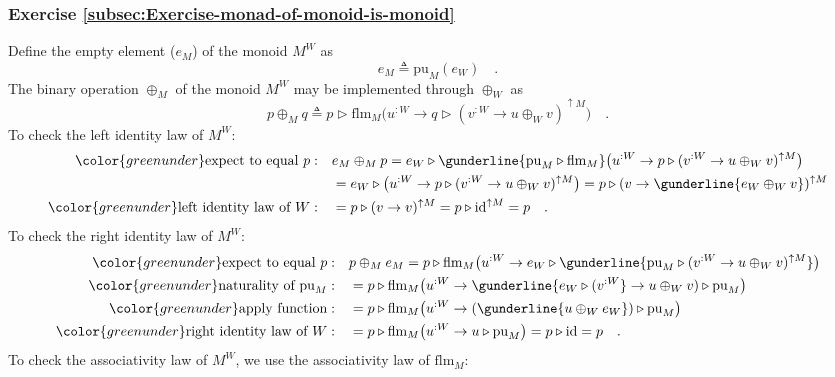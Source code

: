\subsubsection*{Exercise \ref{subsec:Exercise-monad-of-monoid-is-monoid}}

Define the empty element ($e_{M}$) of the monoid $M^{W}$ as 
\[
e_{M}\triangleq\text{pu}_{M}(e_{W})\quad.
\]
The binary operation $\oplus_{M}$ of the monoid $M^{W}$ may be implemented
through $\oplus_{W}$ as
\[
p\oplus_{M}q\triangleq p\triangleright\text{flm}_{M}\big(u^{:W}\rightarrow q\triangleright(v^{:W}\rightarrow u\oplus_{W}v)^{\uparrow M}\big)\quad.
\]
To check the left identity law of $M^{W}$:
\begin{align*}
{\color{greenunder}\text{expect to equal }p:}\quad & e_{M}\oplus_{M}p=e_{W}\triangleright\gunderline{\text{pu}_{M}\triangleright\text{flm}_{M}}\big(u^{:W}\rightarrow p\triangleright(v^{:W}\rightarrow u\oplus_{W}v)^{\uparrow M}\big)\\
 & =e_{W}\triangleright\big(u^{:W}\rightarrow p\triangleright(v^{:W}\rightarrow u\oplus_{W}v)^{\uparrow M}\big)=p\triangleright(v\rightarrow\gunderline{e_{W}\oplus_{W}v})^{\uparrow M}\\
{\color{greenunder}\text{left identity law of }W:}\quad & =p\triangleright(v\rightarrow v)^{\uparrow M}=p\triangleright\text{id}^{\uparrow M}=p\quad.
\end{align*}
To check the right identity law of $M^{W}$:
\begin{align*}
{\color{greenunder}\text{expect to equal }p:}\quad & p\oplus_{M}e_{M}=p\triangleright\text{flm}_{M}\big(u^{:W}\rightarrow e_{W}\triangleright\gunderline{\text{pu}_{M}\triangleright(v^{:W}\rightarrow u\oplus_{W}v)^{\uparrow M}}\big)\\
{\color{greenunder}\text{naturality of }\text{pu}_{M}:}\quad & =p\triangleright\text{flm}_{M}\big(u^{:W}\rightarrow\gunderline{e_{W}\triangleright(v^{:W}}\rightarrow u\oplus_{W}v)\triangleright\text{pu}_{M}\big)\\
{\color{greenunder}\text{apply function}:}\quad & =p\triangleright\text{flm}_{M}\big(u^{:W}\rightarrow(\gunderline{u\oplus_{W}e_{W}})\triangleright\text{pu}_{M}\big)\\
{\color{greenunder}\text{right identity law of }W:}\quad & =p\triangleright\text{flm}_{M}\big(u^{:W}\rightarrow u\triangleright\text{pu}_{M}\big)=p\triangleright\text{id}=p\quad.
\end{align*}
To check the associativity law of $M^{W}$, we use the associativity
law of $\text{flm}_{M}$:
